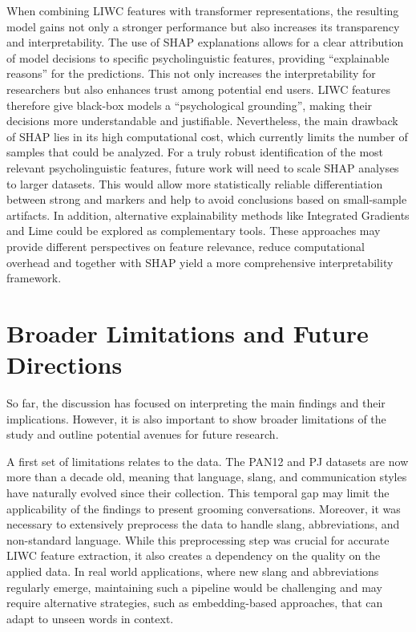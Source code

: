When combining LIWC features with transformer representations, the resulting model gains not only a stronger performance but also increases its transparency and interpretability. The use of SHAP explanations allows for a clear attribution of model decisions to specific psycholinguistic features, providing “explainable reasons” for the predictions. This not only increases the interpretability for researchers but also enhances trust among potential end users. LIWC features therefore give black-box models a “psychological grounding”, making their decisions more understandable and justifiable. Nevertheless, the main drawback of SHAP lies in its high computational cost, which currently limits the number of samples that could be analyzed. For a truly robust identification of the most relevant psycholinguistic features, future work will need to scale SHAP analyses to larger datasets. This would allow more statistically reliable differentiation between strong and markers and help to avoid conclusions based on small-sample artifacts. In addition, alternative explainability methods like Integrated Gradients\cite{integratedgradients} and Lime \cite{ribeiro2016lime} could be explored as complementary tools. These approaches may provide different perspectives on feature relevance, reduce computational overhead and together with SHAP yield a more comprehensive interpretability framework.


\section{Broader Limitations and Future Directions}

So far, the discussion has focused on interpreting the main findings and their implications. However, it is also important to show broader limitations of the study and outline potential avenues for future research.  

A first set of limitations relates to the data. The PAN12 and PJ datasets are now more than a decade old, meaning that language, slang, and communication styles have naturally evolved since their collection. This temporal gap may limit the applicability of the findings to present grooming conversations. Moreover, it was necessary to extensively preprocess the data to handle slang, abbreviations, and non-standard language. While this preprocessing step was crucial for accurate LIWC feature extraction, it also creates a dependency on the quality on the applied data. In real world applications, where new slang and abbreviations regularly emerge, maintaining such a pipeline would be challenging and may require alternative strategies, such as embedding-based approaches, that can adapt to unseen words in context.  

